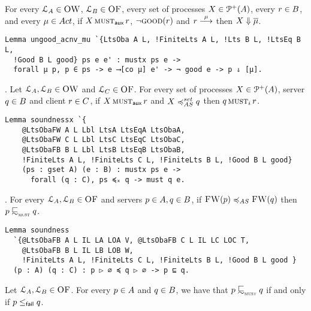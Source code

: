 For every $\mathcal{L}_A \in \textsc{OW}$, $\mathcal{L}_B \in \textsc{OF}$,
every set of processes $X \in \mathcal{P}^{+}( A )$, every $r \in B$, and every $\mu \in \Act$,
if $X \operatorname{\textsc{must}}_{\textsf{aux}} r$, $\lnot \textsc{good}(r)$ and $r \mathrel{\overset{\mu}\longrightarrow}$ then $X \mathrel{\Downarrow} \overline{\mu}$.

\begin{mdframed}
\begin{verbatim}
Lemma ungood_acnv_mu `{LtsOba A L, !FiniteLts A L, !Lts B L, !LtsEq B L,
  !Good B L good} ps e e' : mustx ps e ->
  forall μ p, p ∈ ps -> e ⟶[co μ] e' -> ¬ good e -> p ⇓ [μ].
\end{verbatim}
\end{mdframed}

.
Let $\mathcal{L}_A, \mathcal{L}_B \in \textsc{OW}$ and
$\mathcal{L}_C \in \textsc{OF}$.
For every set of processes $X \in \mathcal{P}^{+}( A )$,
server $q \in B$ and client $r \in C$,
if $X \operatorname{\textsc{must}}_{\textsf{aux}} r$ and $X \asleqset \serverB$ then $q \operatorname{\textsc{must}}_i r$.

\begin{mdframed}
\begin{verbatim}
Lemma soundnessx `{
    @LtsObaFW A L Lbl LtsA LtsEqA LtsObaA,
    @LtsObaFW C L Lbl LtsC LtsEqC LtsObaC,
    @LtsObaFB B L Lbl LtsB LtsEqB LtsObaB,
    !FiniteLts A L, !FiniteLts C L, !FiniteLts B L, !Good B L good}
    (ps : gset A) (e : B) : mustx ps e ->
      forall (q : C), ps ≼ₓ q -> must q e.
\end{verbatim}
\end{mdframed}

.
For every $\mathcal{L}_A, \mathcal{L}_B \in \textsc{OF}$ and
servers $p \in A, q \in B $,
if $\liftFW{ \serverA } \asleq \liftFW{ \serverB }$ then $\serverA \testleqS \serverB$.

\begin{mdframed}
\begin{verbatim}
Lemma soundness
  `{@LtsObaFB A L IL LA LOA V, @LtsObaFB C L IL LC LOC T,
    @LtsObaFB B L IL LB LOB W,
    !FiniteLts A L, !FiniteLts C L, !FiniteLts B L, !Good B L good }
  (p : A) (q : C) : p ▷ ∅ ≼ q ▷ ∅ -> p ⊑ q.
\end{verbatim}
\end{mdframed}

\begin{corollary}
  Let $\mathcal{L}_A, \mathcal{L}_B \in \textsc{OF}$.
  For every $p \in A$  and
  $q \in B $, we have that
  $\serverA \testleqS \serverB$ if and only if
  $p \mathrel{\leq_{\textsf{fail}}} q$.
\end{corollary}

